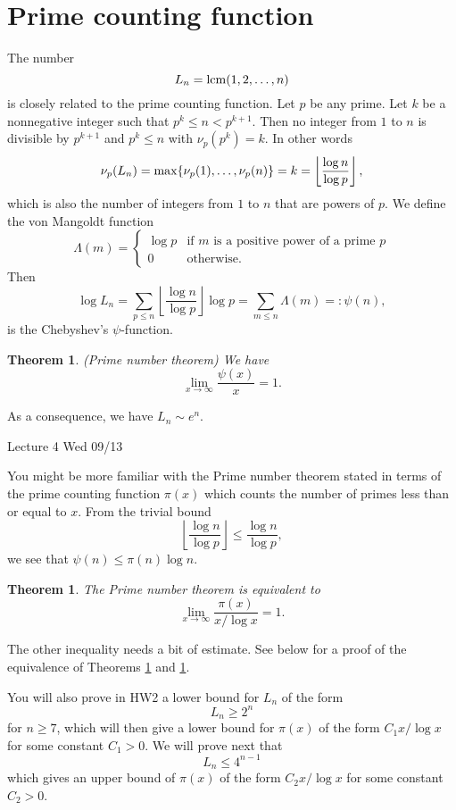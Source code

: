 \documentclass{article}
\def\lcm{{\rm lcm}}
\def\max{{\rm max}}
\newtheorem{theorem}[subsection]{Theorem}
\newcommand{\add}[1]{{\color{blue} #1}}
\begin{document}
\section{Prime counting function}
The number $$L_n = \lcm(1,2,\ldots, n)$$
is closely related to the prime counting function. Let $p$ be any prime. Let $k$ be a nonnegative integer such that $p^k\leq n < p^{k+1}$. Then no integer from $1$ to $n$ is divisible by $p^{k+1}$ and $p^k\leq n$ with $\nu_p(p^k) = k$. In other words $$\nu_p(L_n) = \max\{\nu_p(1),\ldots,\nu_p(n)\} = k = \left\lfloor\frac{\log n}{\log p}\right\rfloor,$$ which is also the number of integers from $1$ to $n$ that are powers of $p$. We define the von Mangoldt function $$\Lambda(m) = \begin{cases}
    \log p&\mbox{if }m\mbox{ is a positive power of a prime }p\\
    0&\mbox{otherwise}.
\end{cases}$$
Then $$\log L_n = \sum_{p\leq n}\left\lfloor\frac{\log n}{\log p}\right\rfloor\log p = \sum_{m\leq n}\Lambda(m) =: \psi(n),$$
is the Chebyshev's $\psi$-function.

\begin{theorem}\label{thm:PMT1}
    (Prime number theorem) We have $$\lim_{x\rightarrow\infty}\frac{\psi(x)}{x} = 1.$$
\end{theorem}
\noindent As a consequence, we have $L_n\sim e^n$.

\begin{center}
    \add{Lecture 4 Wed 09/13}
\end{center}

You might be more familiar with the Prime number theorem stated in terms of the prime counting function
$\pi(x)$ which counts the number of primes less than or equal to $x$. From the trivial bound $$\left\lfloor\frac{\log n}{\log p}\right\rfloor \leq \frac{\log n}{\log p},$$
we see that $\psi(n) \leq \pi(n)\log n$.

\begin{theorem}\label{thm:PMT2}
        The Prime number theorem is equivalent to
    $$\lim_{x\rightarrow\infty}\frac{\pi(x)}{x/\log x} = 1.$$
\end{theorem}
\noindent The other inequality needs a bit of estimate. See below for a proof of the equivalence of Theorems \ref{thm:PMT1} and \ref{thm:PMT2}. 

You will also prove in HW2 a lower bound for $L_n$ of the form $$L_{n}\geq 2^n$$ for $n\geq 7$, which will then give a lower bound for $\pi(x)$ of the form $C_1x/\log x$ for some constant $C_1>0$. We will prove next that $$L_n\leq 4^{n-1}$$
which gives an upper bound of $\pi(x)$ of the form $C_2x/\log x$ for some constant $C_2>0$.
\end{document}

